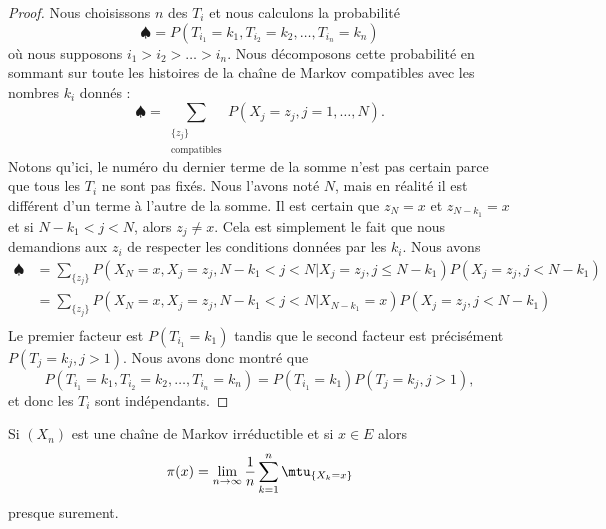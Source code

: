 \begin{proof}
    Nous choisissons \( n\) des \( T_i\) et nous calculons la probabilité
    \begin{equation}
        \spadesuit=P(T_{i_1}=k_1,T_{i_2}=k_2,\ldots,T_{i_n}=k_n)
    \end{equation}
    où nous supposons \( i_1>i_2>\ldots>i_n\). Nous décomposons cette probabilité en sommant sur toute les histoires de la chaîne de Markov compatibles avec les nombres \( k_i\) donnés :
    \begin{equation}
        \spadesuit=\sum_{\substack{\{ z_j \}\\\text{compatibles}}}P(X_j=z_j,j=1,\ldots,N).
    \end{equation}
    Notons qu'ici, le numéro du dernier terme de la somme n'est pas certain parce que tous les \( T_i\) ne sont pas fixés. Nous l'avons noté \( N\), mais en réalité il est différent d'un terme à l'autre de la somme. Il est certain que \( z_N=x\) et \( z_{N-k_1}=x\) et si \( N-k_1<j<N\), alors \( z_j\neq x\). Cela est simplement le fait que nous demandions aux \( z_i\) de respecter les conditions données par les \( k_i\). Nous avons
    \begin{subequations}
        \begin{align}
            \spadesuit&=\sum_{\{ z_j \}} P(X_N=x,X_j=z_j,N-k_1<j<N|X_j=z_j,j\leq N-k_1)P(X_j=z_j,j<N-k_1)\\
            &=\sum_{\{ z_j \}} P(X_N=x,X_j=z_j,N-k_1<j<N|X_{N-k_1}=x)P(X_j=z_j,j<N-k_1)\\
        \end{align}
    \end{subequations}
    Le premier facteur est \( P(T_{i_1}=k_1)\) tandis que le second facteur est précisément \( P(T_{j}=k_j,j>1)\). Nous avons donc montré que
    \begin{equation}
        P(T_{i_1}=k_1,T_{i_2}=k_2,\ldots,T_{i_n}=k_n)=P(T_{i_1}=k_1)P(T_{j}=k_j,j>1),
    \end{equation}
    et donc les \( T_i\) sont indépendants.
\end{proof}

\begin{proposition}     \label{PropjOjDux}
    Si \( (X_n)\) est une chaîne de Markov irréductible et si \( x\in E\) alors
    \begin{equation}        \label{EqPiEndempropropkeu}
        \pi(x)=\lim_{n\to \infty} \frac{1}{ n }\sum_{k=1}^n\mtu_{\{ X_k=x \}}
    \end{equation}
    presque surement.
\end{proposition}

